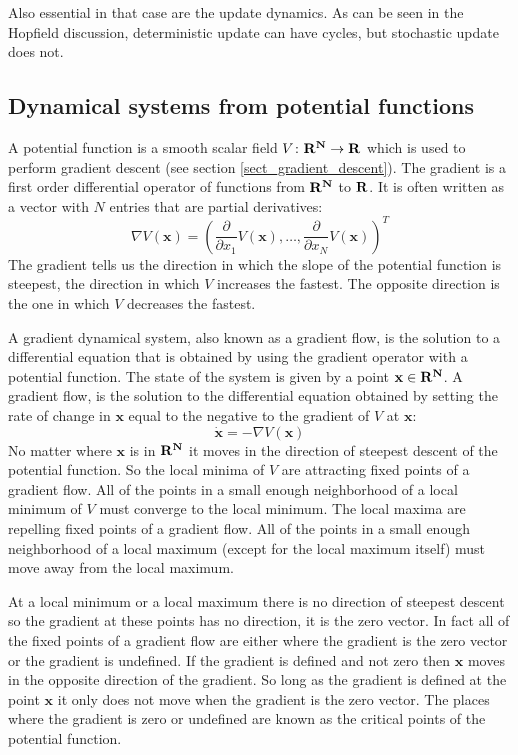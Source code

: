 Also essential in that case are the update dynamics. As can be seen in the Hopfield discussion, deterministic update can have cycles, but stochastic update does not.

\subsection{Dynamical systems from potential functions}

   A potential function is a smooth scalar field $V \colon \bf{R}^N \to 
\bf{R}$ which is used to perform gradient descent (see section 
\ref{sect_gradient_descent}). The gradient is a first order 
differential operator of functions from $\bf{R}^N$ to $\bf{R}$.  It is often
written as a vector with $N$ entries that are partial derivatives:
\begin{equation*}
   \nabla V(\mathbf{x}) = \left( \dfrac{\partial}{\partial x_1} V(\mathbf{x}),
\ldots, \dfrac{\partial}{\partial x_N} V(\mathbf{x}) \right)^T
\end{equation*}
The gradient tells us the direction in which the slope of the potential 
function is steepest, the direction in which $V$ increases the fastest.  The 
opposite direction is the one in which $V$ decreases the fastest.  

   A gradient dynamical system, also known as a gradient flow, is the solution 
to a differential equation that is obtained by using the gradient operator with
a potential function.  The state of the system is given by a point $\mathbf{x} 
\in \bf{R}^N$.  A gradient flow, is the solution to the differential equation 
obtained by setting the rate of change in $\mathbf{x}$ equal to the negative to 
the gradient of $V$ at $\mathbf{x}$:
\begin{equation}
   \dot{\mathbf{x}} = -\nabla V(\mathbf{x}) 
\end{equation}
No matter where $\mathbf{x}$ is in $\bf{R}^N$ it moves in the direction of
steepest descent of the potential function.  So the local minima of $V$ are 
attracting fixed points of a gradient flow.  All of the points in a small 
enough neighborhood of a local minimum of $V$ must converge to the local 
minimum.  The local maxima are repelling fixed points of a gradient flow.  All 
of the points in a small enough neighborhood of a local maximum (except for 
the local maximum itself) must move away from the local maximum.  

   At a local minimum or a local maximum there is no direction of steepest
descent so the gradient at these points has no direction, it is the zero 
vector.  In fact all of the fixed points of a gradient flow are either where 
the gradient is the zero vector or the gradient is undefined.  If the gradient 
is defined and not zero then $\mathbf{x}$ moves in the opposite direction of 
the gradient.  So long as the gradient is defined at the point $\mathbf{x}$ it
only does not move when the gradient is the zero vector.  The places where the 
gradient is zero or undefined are known as the critical points of the potential 
function.

